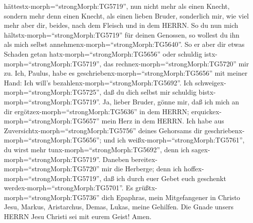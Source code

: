 hättestx-morph=``strongMorph:TG5719'',  nun nicht mehr als
einen Knecht, sondern mehr denn einen Knecht, als einen lieben Bruder,
sonderlich mir, wie viel mehr aber dir, beides, nach dem Fleisch und in
dem HERRN.  So du nun mich
hältstx-morph=``strongMorph:TG5719'' für deinen Genossen, so wollest du
ihn als mich selbst annehmenx-morph=``strongMorph:TG5640''.
 So er aber dir etwas Schaden getan
hatx-morph=``strongMorph:TG5656'' oder schuldig
istx-morph=``strongMorph:TG5719'', das
rechnex-morph=``strongMorph:TG5720'' mir zu.  Ich, Paulus,
habe es geschriebenx-morph=``strongMorph:TG5656'' mit meiner Hand: Ich
will's bezahlenx-morph=``strongMorph:TG5692''. Ich
schweigex-morph=``strongMorph:TG5725'', daß du dich selbst mir schuldig
bistx-morph=``strongMorph:TG5719''.  Ja, lieber Bruder,
gönne mir, daß ich mich an dir ergötzex-morph=``strongMorph:TG5636'' in
dem HERRN; erquickex-morph=``strongMorph:TG5657'' mein Herz in dem
HERRN.  Ich habe aus
Zuversichtx-morph=``strongMorph:TG5756'' deines Gehorsams dir
geschriebenx-morph=``strongMorph:TG5656''; und ich
weißx-morph=``strongMorph:TG5761'', du wirst mehr
tunx-morph=``strongMorph:TG5692'', denn ich
sagex-morph=``strongMorph:TG5719''.  Daneben
bereitex-morph=``strongMorph:TG5720'' mir die Herberge; denn ich
hoffex-morph=``strongMorph:TG5719'', daß ich durch euer Gebet euch
geschenkt werdex-morph=``strongMorph:TG5701''.  Es
grüßtx-morph=``strongMorph:TG5736'' dich Epaphras, mein Mitgefangener in
Christo Jesu,  Markus, Aristarchus, Demas, Lukas, meine
Gehilfen.  Die Gnade unsers HERRN Jesu Christi sei mit
eurem Geist! Amen.
